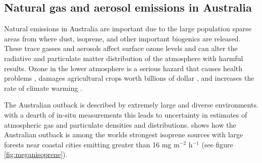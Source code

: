 \subsection{Natural gas and aerosol emissions in Australia}
Natural emissions in Australia are important due to the large population sparse areas from where dust, isoprene, and other important biogenics are released.
These trace gasses and aerosols affect surface ozone levels and can alter the radiative and particulate matter distribution of the atmosphere with harmful results.
Ozone in the lower atmosphere is a serious hazard that causes health problems \cite{Hsieh_2013}, damages agricultural crops worth billions of dollar \cite{Avnery_2011}, and increases the rate of climate warming \cite{IPCC_2013_chap8}. 

The Australian outback is described by extremely large and diverse environments. 
with a dearth of in-situ measurements this leads to uncertainty in estimates of atmospheric gas and particulate densities and distributions.
\citet{Guenther_2006} shows how the Australian outback is among the worlds strongest isoprene sources with large forests near coastal cities emitting greater than 16 mg m$^{-2}$ h$^{-1}$ (see figure \ref{fig:meganisoprene}).


  
  
